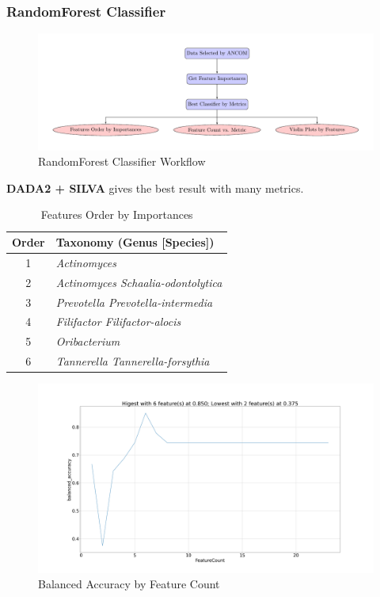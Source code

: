 \documentclass{beamer}
\begin{document}
    \begin{frame}[allowframebreaks]
        \frametitle{RandomForest Classifier}

        \begin{figure}
            \includegraphics[width=0.8 \linewidth]{figures/RandomForest/whole.pdf}
            \caption{RandomForest Classifier Workflow}
        \end{figure}

        \textbf{DADA2 + SILVA} gives the best result with many metrics.

        \begin{table}
            \caption{Features Order by Importances}
            \begin{tabular}{c|l}
                Order & Taxonomy (Genus [Species]) \\ \hline
                1 & \textit{Actinomyces} \\
                2 & \textit{Actinomyces Schaalia-odontolytica} \\
                3 & \textit{Prevotella Prevotella-intermedia} \\
                4 & \textit{Filifactor Filifactor-alocis} \\
                5 & \textit{Oribacterium} \\
                6 & \textit{Tannerella Tannerella-forsythia} \\
            \end{tabular}
        \end{table}

        \begin{figure}
            \includegraphics[width=0.8 \linewidth]{figures/RandomForest/whole-DADA-silva/balanced_accuracy.png}
            \caption{Balanced Accuracy by Feature Count}
        \end{figure}


\end{frame}
\end{document}
